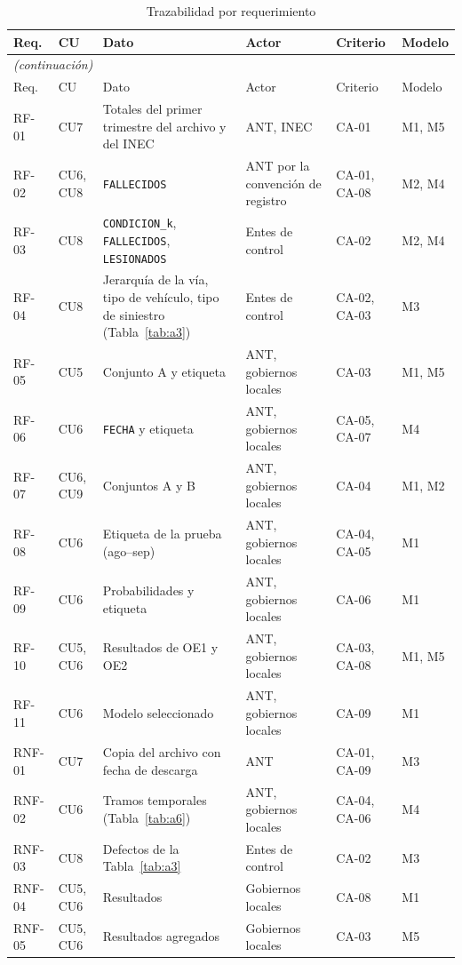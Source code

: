 \begin{longtable}{p{1.3cm}p{1.7cm}p{3.6cm}p{2.3cm}p{2.1cm}p{1.8cm}}
\caption{Trazabilidad por requerimiento}
\label{tab:trazabilidad-rf}\\
\toprule
Req. & CU & Dato & Actor & Criterio & Modelo \\
\midrule
\endfirsthead
\multicolumn{6}{l}{\footnotesize\itshape (continuación)}\\
\toprule
Req. & CU & Dato & Actor & Criterio & Modelo \\
\midrule
\endhead
\bottomrule
\endfoot
RF-01 & CU7 & Totales del primer trimestre del archivo y del INEC & ANT, INEC & CA-01 & M1, M5 \\
RF-02 & CU6, CU8 & \texttt{FALLECIDOS} & ANT por la convención de registro & CA-01, CA-08 & M2, M4 \\
RF-03 & CU8 & \texttt{CONDICION\_k}, \texttt{FALLECIDOS}, \texttt{LESIONADOS} & Entes de control & CA-02 & M2, M4 \\
RF-04 & CU8 & Jerarquía de la vía, tipo de vehículo, tipo de siniestro (Tabla~\ref{tab:a3}) & Entes de control & CA-02, CA-03 & M3 \\
RF-05 & CU5 & Conjunto A y etiqueta & ANT, gobiernos locales & CA-03 & M1, M5 \\
RF-06 & CU6 & \texttt{FECHA} y etiqueta & ANT, gobiernos locales & CA-05, CA-07 & M4 \\
RF-07 & CU6, CU9 & Conjuntos A y B & ANT, gobiernos locales & CA-04 & M1, M2 \\
RF-08 & CU6 & Etiqueta de la prueba (ago--sep) & ANT, gobiernos locales & CA-04, CA-05 & M1 \\
RF-09 & CU6 & Probabilidades y etiqueta & ANT, gobiernos locales & CA-06 & M1 \\
RF-10 & CU5, CU6 & Resultados de OE1 y OE2 & ANT, gobiernos locales & CA-03, CA-08 & M1, M5 \\
RF-11 & CU6 & Modelo seleccionado & ANT, gobiernos locales & CA-09 & M1 \\
RNF-01 & CU7 & Copia del archivo con fecha de descarga & ANT & CA-01, CA-09 & M3 \\
RNF-02 & CU6 & Tramos temporales (Tabla~\ref{tab:a6}) & ANT, gobiernos locales & CA-04, CA-06 & M4 \\
RNF-03 & CU8 & Defectos de la Tabla~\ref{tab:a3} & Entes de control & CA-02 & M3 \\
RNF-04 & CU5, CU6 & Resultados & Gobiernos locales & CA-08 & M1 \\
RNF-05 & CU5, CU6 & Resultados agregados & Gobiernos locales & CA-03 & M5 \\
\end{longtable}
